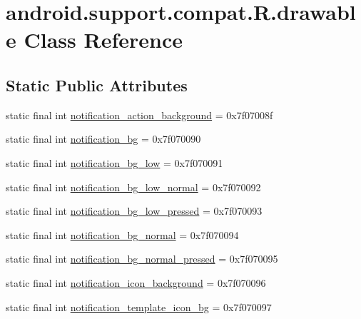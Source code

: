 \hypertarget{classandroid_1_1support_1_1compat_1_1R_1_1drawable}{}\section{android.\+support.\+compat.\+R.\+drawable Class Reference}
\label{classandroid_1_1support_1_1compat_1_1R_1_1drawable}
\subsection*{Static Public Attributes}
\begin{DoxyCompactItemize}
\item 
static final int \mbox{\hyperlink{classandroid_1_1support_1_1compat_1_1R_1_1drawable_a5a0ff2bac77963f6f055c8a58fa8cddc}{notification\+\_\+action\+\_\+background}} = 0x7f07008f
\item 
static final int \mbox{\hyperlink{classandroid_1_1support_1_1compat_1_1R_1_1drawable_ac1c881403cf01387a0e98a7570b876b5}{notification\+\_\+bg}} = 0x7f070090
\item 
static final int \mbox{\hyperlink{classandroid_1_1support_1_1compat_1_1R_1_1drawable_a50d65295159113b04a778cb5ba4e2867}{notification\+\_\+bg\+\_\+low}} = 0x7f070091
\item 
static final int \mbox{\hyperlink{classandroid_1_1support_1_1compat_1_1R_1_1drawable_a36abe44ab726cfdcec08ea89273622cd}{notification\+\_\+bg\+\_\+low\+\_\+normal}} = 0x7f070092
\item 
static final int \mbox{\hyperlink{classandroid_1_1support_1_1compat_1_1R_1_1drawable_a7a21ec6e1a66256a6e5fb1c7086d77f0}{notification\+\_\+bg\+\_\+low\+\_\+pressed}} = 0x7f070093
\item 
static final int \mbox{\hyperlink{classandroid_1_1support_1_1compat_1_1R_1_1drawable_acc54d2d50a9408e4498025dfd0f797a2}{notification\+\_\+bg\+\_\+normal}} = 0x7f070094
\item 
static final int \mbox{\hyperlink{classandroid_1_1support_1_1compat_1_1R_1_1drawable_adb300808ead93d2b6dfaaddcc86b1c10}{notification\+\_\+bg\+\_\+normal\+\_\+pressed}} = 0x7f070095
\item 
static final int \mbox{\hyperlink{classandroid_1_1support_1_1compat_1_1R_1_1drawable_a24197e0b532bda0461aa61918e2e1aee}{notification\+\_\+icon\+\_\+background}} = 0x7f070096
\item 
static final int \mbox{\hyperlink{classandroid_1_1support_1_1compat_1_1R_1_1drawable_a031cc831b36dacf4d9503beaf4ee1190}{notification\+\_\+template\+\_\+icon\+\_\+bg}} = 0x7f070097

\end{DoxyCompactItemize}
